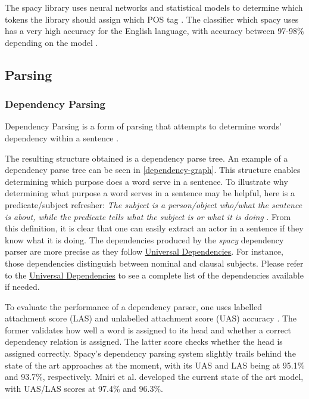 The spacy library uses neural networks and statistical models to determine which tokens the library should assign which POS tag \cite{RefWorks:RefID:25-spacy}.
The classifier which spacy uses has a very high accuracy for the English language, with accuracy between 97-98\% depending on the model \cite{RefWorks:RefID:26-spacy}.



\subsection{Parsing}

\subsubsection{Dependency Parsing}

Dependency Parsing is a form of parsing that attempts to determine words' dependency within a sentence \cite{RefWorks:RefID:28-jurafsky2014speech}.

The resulting structure obtained is a dependency parse tree.
An example of a dependency parse tree can be seen in \ref{dependency-graph}.
This structure enables determining which purpose does a word serve in a sentence.
To illustrate why determining what purpose a word serves in a sentence may be helpful, here is a predicate/subject refresher:
\emph{The subject is a person/object who/what the sentence is about, while the predicate tells what the subject is or what it is doing} \cite{RefWorks:RefID:27-subject}.
From this definition, it is clear that one can easily extract an actor in a sentence if they know what it is doing.
The dependencies produced by the \emph{spacy} dependency parser are more precise as they follow \hyperlink{https://univesaldependencies.org}{Universal Dependencies}.
For instance, those dependencies distinguish between nominal and clausal subjects.
Please refer to the \hyperlink{https://univesaldependencies.org}{Universal Dependencies} to see a complete list of the dependencies available if needed. 


To evaluate the performance of a dependency parser, one uses labelled attachment score (LAS) and unlabelled attachment score (UAS) accuracy \cite{RefWorks:RefID:28-jurafsky2014speech}.
The former validates how well a word is assigned to its head and whether a correct dependency relation is assigned.
The latter score checks whether the head is assigned correctly.
Spacy's dependency parsing system slightly trails behind the state of the art approaches at the moment, with its UAS and LAS being at 95.1\% and 93.7\%, respectively. 
Mniri et al. \cite{RefWorks:RefID:29-mrini2019rethinking} developed the current state of the art model, with UAS/LAS scores at 97.4\% and 96.3\%.

